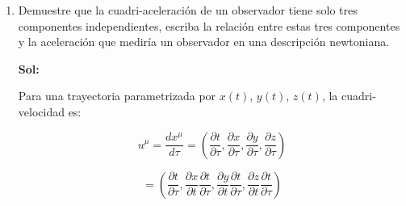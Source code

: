 \documentclass[12pt,a4paper]{article}
\begin{document}
\begin{enumerate}
\begin{equation*}
    \frac{d u^{\mu}}{d \tau} = \frac{d}{d \tau} \left( \left(\frac{\partial \lambda}{\partial \tau}\frac{1}{\cosh{\frac{\lambda}{a}}},\frac{\partial \lambda}{\partial \tau}\frac{1}{\cosh{\frac{\lambda}{a}}}\tanh{\frac{\lambda}{a}}\right)\right)
\end{equation*}

\begin{equation*}
    =
\end{equation*}

\begin{equation*}
    \hspace{-4cm}=\left(\frac{1}{\cosh{\lambda/a}}\frac{\partial^2 \lambda}{\partial \tau^2} - \frac{\partial^2 \lambda}{\partial \tau^2} \frac{\tanh{\lambda/2}\text{ sech }\lambda/2}{a},(\frac{\partial \lambda}{\partial \tau})^2\frac{1}{\cosh{\frac{\lambda}{a}}}  \frac{\text{ sech}^2 \lambda/a}{a} +\left(\frac{1}{\cosh{\lambda/a}}\frac{\partial^2 \lambda}{\partial \tau^2} - \frac{\partial^2 \lambda}{\partial \tau^2} \frac{\tanh{\lambda/2}\text{ sech }\lambda/2}{a}\right) \tanh{\frac{\lambda}{a}} \right)
\end{equation*}










\item Demuestre que la cuadri-aceleración de un observador tiene solo tres componentes independientes, escriba la relación entre estas tres componentes y la aceleración que mediría un observador en una descripción newtoniana.

\textbf{Sol:}

Para una trayectoria parametrizada por $x(t)$, $y(t)$, $z(t)$, la cuadri-velocidad es:

\begin{equation*}
    u^{\mu} = \frac{d x^{\mu}}{d\tau} = \left(\frac{\partial t}{\partial \tau},\frac{\partial x}{\partial \tau},\frac{\partial y}{\partial \tau},\frac{\partial z}{\partial \tau}\right)
\end{equation*}

\begin{equation*}
    =\left(\frac{\partial t}{\partial \tau}, \frac{\partial x}{\partial t} \frac{\partial t}{\partial \tau},\frac{\partial y}{\partial t} \frac{\partial t}{\partial \tau},\frac{\partial z}{\partial t} \frac{\partial t}{ \partial \tau}\right)
\end{equation*}


\end{enumerate}
\end{document}
